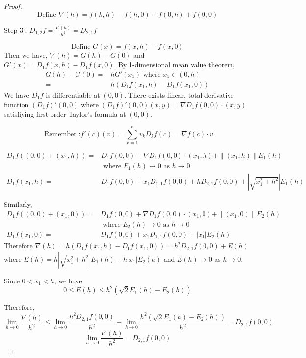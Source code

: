 \begin{proof}
	\begin{equation}
		\text{Define }\nabla(h) = f(h,h)-f(h,0)-f(0,h)+f(0,0)
	\end{equation}
\begin{commentary}Step 3 : $D_{1,2} f = \frac{\nabla(h)}{h^2} = D_{2,1} f$\end{commentary}
\begin{equation}
	\text{Define }G(x) = f(x,h)-f(x,0)
\end{equation}
Then  we have, $\nabla(h) = G(h)-G(0)$ and $G'(x) = D_1f(x,h) - D_1f(x,0)$.
By 1-dimensional mean value theorem,
\begin{align*}
	G(h)-G(0) = & hG'(x_1)  \text{ where } x_1 \in (0,h) \\
	= & h\left( D_1f(x_1,h)-D_1f(x_1,0)\right)
\end{align*}
We have $D_1 f$ is differentiable at $(0,0)$.
There exists linear, total derivative function $(D_1f)'(0,0)$ where $(D_1f)'(0,0)(x,y) = \nabla D_1 f(0,0) \cdot{} (x,y)$ satisfiying first-order Taylor's formula at $(0,0)$. 
\begin{commentary}
\[ \text{ Remember :} f'(\bar{c})(\bar{v}) = \sum_{k = 1}^n v_k D_k f(\bar{c}) = \nabla f(\bar{c}) \cdot{} \bar{v} \]
\end{commentary}
\begin{align*}
	D_1 f((0,0) + (x_1,h)) = & D_1 f(0,0) + \nabla D_1 f(0,0) \cdot{} (x_1,h) + \|(x_1,h)\| E_1(h) \\
	& \text{ where } E_1(h) \to 0 \text{ as } h \to 0\\
	D_1 f(x_1,h) = & D_1 f(0,0) + x_1 D_{1,1} f(0,0) + h D_{2,1} f(0,0) + \left|\sqrt{x_1^2+h^2}\right| E_1(h)
\end{align*}

Similarly,
\begin{align*}
	D_1 f((0,0) + (x_1,0)) = & D_1 f(0,0) + \nabla D_1 f(0,0) \cdot{} (x_1,0) + \|(x_1,0)\| E_2(h) \\
	& \text{ where } E_2(h) \to 0 \text{ as } h  \to 0 \\
	D_1 f(x_1,0) = & D_1 f(0,0) + x_1 D_{1,1} f(0,0) + |x_1| E_2(h)
\end{align*}
Therefore $\nabla(h) = h (D_1 f(x_1,h) - D_1 f(x_1,0)) = h^2 D_{2,1} f(0,0) + E(h)$ where $E(h) = h|\sqrt{x_1^2+h^2}| E_1(h) - h|x_1|E_2(h)$ and $E(h) \to 0$ as $h \to 0$.

Since $0 < x_1 < h$, we have
$$ 0 \le E(h) \le h^2\left(\sqrt{2}E_1(h)-E_2(h)\right)$$

Therefore,
	$$\lim_{h \to 0} \frac{\nabla(h)}{h^2} \le \lim_{h \to 0} \frac{h^2 D_{2,1} f(0,0)}{h^2} + \lim_{h \to 0} \frac{h^2 (\sqrt{2}E_1(h) - E_2(h))}{h^2} = D_{2,1}f(0,0)$$
\begin{equation}
\lim_{h \to 0} \frac{\nabla(h)}{h^2} = D_{2,1} f(0,0)
\end{equation}


\end{proof}
